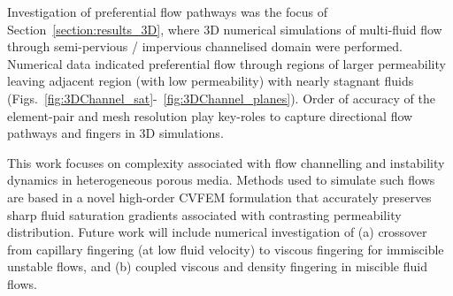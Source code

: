 \documentclass[preprint,authoryear,12pt]{elsarticle}
\begin{document}
\medskip
Investigation of preferential flow pathways was the focus of Section~\ref{section:results_3D}, where 3D numerical simulations of multi-fluid flow through semi-pervious / impervious channelised domain were performed. Numerical data indicated preferential flow through regions of larger permeability leaving adjacent region (with low permeability) with nearly stagnant fluids (Figs.~\ref{fig:3DChannel_sat}-~\ref{fig:3DChannel_planes}). Order of accuracy of the element-pair and mesh resolution play key-roles to capture directional flow pathways and fingers in 3D simulations.

\medskip
This work focuses on complexity associated with flow channelling and instability dynamics in heterogeneous porous media. Methods used to simulate such flows are based in a novel high-order CVFEM formulation that accurately preserves sharp fluid saturation gradients associated with contrasting permeability distribution. Future work will include numerical investigation of (a) crossover from capillary fingering (at low fluid velocity) to viscous fingering for immiscible unstable flows, and (b) coupled viscous and density fingering in miscible fluid flows.
\end{document}
